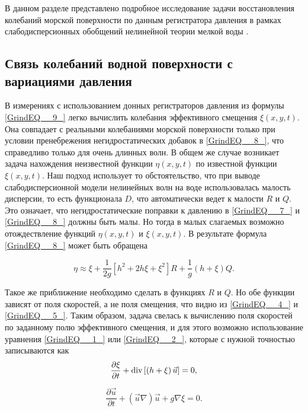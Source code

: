 В данном разделе представлено подробное исследование задачи восстановления колебаний морской поверхности по данным регистратора давления в рамках слабодисперсионных обобщений нелинейной теории мелкой воды \cite{Green_1976, Zhel_Pel_1985, Fedotova_2008, Fedotova_2012}.

\subsection{Связь колебаний водной поверхности с вариациями давления}

В измерениях с использованием донных регистраторов давления из формулы \eqref{GrindEQ__9_} легко вычислить колебания эффективного смещения $\xi(x,y,t)$. Она совпадает с реальными колебаниями морской поверхности только при условии пренебрежения негидростатических добавок в \eqref{GrindEQ__8_}, что справедливо только для очень длинных волн. В общем же случае возникает задача нахождения неизвестной функции $\eta(x,y,t)$ по известной функции $\xi(x,y,t)$. Наш подход использует то обстоятельство, что при выводе слабодисперсионной модели нелинейных волн на воде использовалась малость дисперсии, то есть функционала $D$, что автоматически ведет к малости $R$ и $Q$. Это означает, что негидростатические поправки к давлению в \eqref{GrindEQ__7_} и \eqref{GrindEQ__8_} должны быть малы. Но тогда в малых слагаемых возможно отождествление функций $\eta(x,y,t)$ и $\xi(x,y,t)$. В результате формула \eqref{GrindEQ__8_} может быть обращена

\begin{equation} \label{GrindEQ__10_}
\eta \approx \xi +\frac{1}{2g} \left[h^{2} +2h\xi +\xi ^{2} \right]R+\frac{1}{g} (h+\xi )Q.
\end{equation}


Такое же приближение необходимо сделать в функциях $R$ и $Q$. Но обе функции зависят от поля скоростей, а не поля смещения, что видно из \eqref{GrindEQ__4_} и \eqref{GrindEQ__5_}. Таким образом, задача свелась к вычислению поля скоростей по заданному полю эффективного смещения, и для этого возможно использование уравнения \eqref{GrindEQ__1_} или \eqref{GrindEQ__2_}, которые с нужной точностью записываются как
\begin{equation} \label{GrindEQ__11_}
\frac{\partial \xi }{\partial t} +{\rm div}\left[\left(h+\xi \right)\vec{u}\right]=0,
\end{equation}

\begin{equation} \label{GrindEQ__12_}
\frac{\partial \vec{u}}{\partial t} +(\vec{u}\nabla )\vec{u}+g\nabla \xi =0.
\end{equation}


